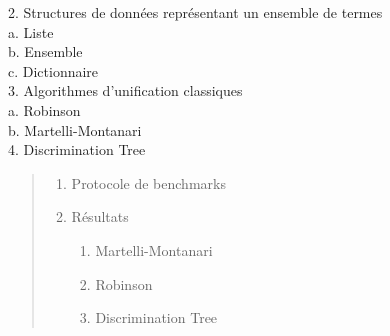 \documentclass[11pt]{article}
\begin{document}
\begin{titlepage}
\begin{center}
\begin{minipage}{0.8\textwidth}
            
            \hspace*{2.8em}2. Structures de données représentant un ensemble de termes \dotfill \pageref{ensemble_termes} \\[0.5em]
            \hspace*{4.5em}a. Liste \dotfill \pageref{liste} \\[0.3em]
            \hspace*{4.5em}b. Ensemble \dotfill \pageref{ensemble} \\[0.3em]
            \hspace*{4.5em}c. Dictionnaire \dotfill \pageref{dictionnaire} \\[0.5em]
            
            \hspace*{2.8em}3. Algorithmes d'unification classiques \dotfill \pageref{algo_unif} \\[0.5em]
            \hspace*{4.5em}a. Robinson \dotfill \pageref{robinson} \\[0.5em]
            \hspace*{4.5em}b. Martelli-Montanari \dotfill \pageref{martelli_montanari} \\[0.3em]
            
            \hspace*{2.8em}4. Discrimination Tree \dotfill \pageref{discrimination_tree}
                        

            \vspace{0.3cm}
             \dotfill \pageref{resultats}
            \begin{quote}
                \begin{enumerate}[label=\arabic*., leftmargin=1.5em, itemsep=0.1em]
                    
                    \item Protocole de benchmarks
                    \item Résultats
                    \begin{enumerate}[label=\alph*., leftmargin=1.5em, itemsep=0em]
                        \item Martelli-Montanari
                        \item Robinson
                        \item Discrimination Tree
                    \end{enumerate}
                \end{enumerate}
            \end{quote}

            \vspace{0.5cm}
             \dotfill \pageref{conclusion}
        \end{minipage}
    \end{center}

    \vspace*{\fill} %
\end{titlepage}
\end{document}
